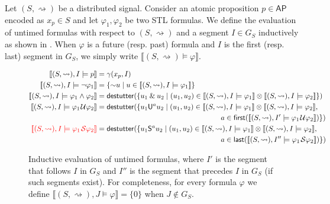 \documentclass[iicol,lineno]{sn-jnl}
\renewcommand{\cref}{\Cref}
\newcommand{\first}{\textsf{first}}
\newcommand{\last}{\textsf{last}}
\newcommand{\hb}{\rightsquigarrow}
\newcommand{\AP}{\mathsf{AP}}
\newcommand{\destutter}{\mathsf{destutter}}
\newcommand*\BitAnd{\mathbin{\&}}
\newcommand*\BitNeg{\ensuremath{\mathord{\sim}}}
\def\until{\kern.1em\mathcal{U}}
\def\since{\kern.1em\mathcal{S}}
\newcommand{\?}{\text{?}}
\newcommand{\suchthat}{\;\ifnum\currentgrouptype=16 \middle\fi|\;}
\let\st\suchthat
\begin{document}
	Let  $(S, {\hb})$ be a distributed signal.
	Consider an atomic proposition $p \in \AP$ encoded as $x_p \in S$ and let $\varphi_1, \varphi_2$ be two STL formulas.
	We define the evaluation of untimed formulas with respect to $(S, {\hb})$ and a segment $I \in G_S$ inductively as shown in \cref{fig:eval}.
	When $\varphi$ is a future (resp. past) formula and $I$ is the first (resp. last) segment in $G_S$, we simply write $\llbracket (S, {\hb}) \models \varphi \rrbracket$.
	
	\begin{figure}[!t]
		\begin{align*}
			\llbracket (S, {\hb}), I \models p \rrbracket &= \gamma(x_p, I) \\
			\llbracket (S, {\hb}), I \models \lnot \varphi_1 \rrbracket &= \{\BitNeg u \st u \in  \llbracket (S, {\hb}), I \models \varphi_1 \rrbracket \} \\
			\llbracket (S, {\hb}), I \models \varphi_1 \land \varphi_2 \rrbracket &= \destutter(\{ u_1 \BitAnd u_2 \st (u_1, u_2) \in \llbracket (S, {\hb}), I \models \varphi_1 \rrbracket \otimes \llbracket (S, {\hb}), I \models \varphi_2 \rrbracket  \}) \\
			\llbracket (S, {\hb}), I \models \varphi_1 \until \varphi_2 \rrbracket &= \destutter(\{ u_1 \mathsf{U}^a u_2 \st (u_1, u_2) \in \llbracket (S, {\hb}), I \models \varphi_1 \rrbracket \otimes \llbracket (S, {\hb}), I \models \varphi_2 \rrbracket, \\
			&\hspace{17em} a \in \first(\llbracket (S, {\hb}), I' \models \varphi_1 \until \varphi_2 \rrbracket) \}) \\
			\bgroup \color{red}\llbracket (S, {\hb}), I \models \varphi_1 \since \varphi_2 \rrbracket \egroup &= \destutter(\{ u_1 \mathsf{S}^a u_2 \st (u_1, u_2) \in \llbracket (S, {\hb}), I \models \varphi_1 \rrbracket \otimes \llbracket (S, {\hb}), I \models \varphi_2 \rrbracket, \\
			&\hspace{17em} a \in \last(\llbracket (S, {\hb}), I'' \models \varphi_1 \since \varphi_2 \rrbracket) \})
		\end{align*}
		\caption{Inductive evaluation of untimed formulas, where $I'$ is the segment that follows $I$ in $G_S$  and  $I''$ is the segment that precedes $I$ in $G_S$ (if such segments exist). For completeness, for every formula $\varphi$ we define $\llbracket (S, {\hb}), J \models \varphi \rrbracket = \{0\}$ when $J \notin G_S$. \label{fig:eval}}
	\end{figure}
	
\end{document}
